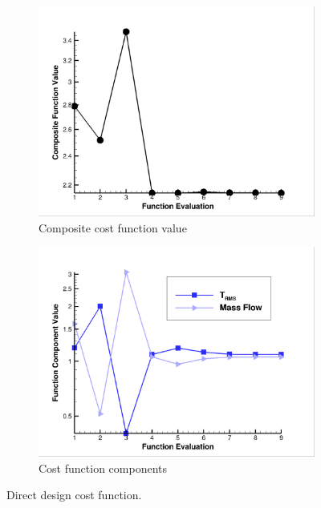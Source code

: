 \begin{figure}[h]
  \centering
	\begin{subfigure}[b]{0.4\textwidth}
    \centering
    \includegraphics[width=\textwidth]{figures/direct_design/cost-func.png}
    \caption{Composite cost function value}
    \label{fig:dd-cost-func-value}
  \end{subfigure}
	\begin{subfigure}[b]{0.4\textwidth}
    \centering
    \includegraphics[width=\textwidth]{figures/direct_design/components.png}
    \caption{Cost function components}
    \label{fig:dd-components}
  \end{subfigure}
  \caption{Direct design cost function.}
  \label{fig:dd-cost-func}
\end{figure}
